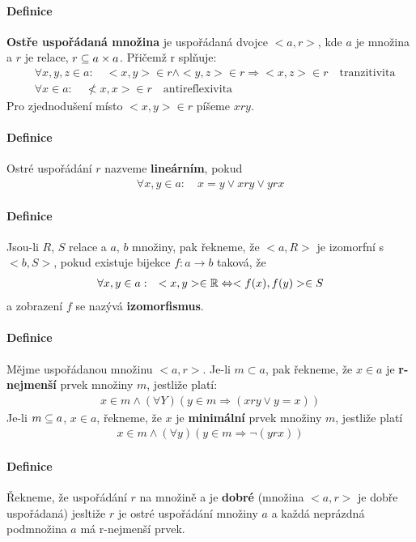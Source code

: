 \documentclass[a4paper,12pt,titlepage]{article}
\begin{document}
\paragraph{Definice}
\textbf{Ostře uspořádaná množina} je uspořádaná dvojce $<a, r>$, kde $a$ je
množina a $r$ je relace, $r \subseteq a \times a $. Přičemž r splňuje:
\begin{align}
	&\forall x, y, z \in a : \quad <x,y> \in r \land <y,z> \in r \Rightarrow
	<x,z> \in r \quad \text{tranzitivita} \\
	&\forall x \in a: \quad \not <x,x> \in r \quad \text{antireflexivita}
\end{align}
Pro zjednodušení místo $<x,y> \in r$ píšeme $x r y$.
\paragraph{Definice}
Ostré uspořádání $r$ nazveme \textbf{lineárním}, pokud 
\begin{align}
	\forall x,y \in a: \quad x = y \lor x r y \lor y r x 
\end{align}
\paragraph{Definice}
Jsou-li $R$, $S$ relace a $a$, $b$ množiny, pak řekneme, že $<a, R>$ je izomorfní
s $<b, S>$, pokud existuje bijekce $f: a\to b$ taková, že
\begin{align}
	\forall x,y \in a: \quad <x,y> \in \mathbb{R} \Leftrightarrow <f(x), f(y)> \in S
\end{align}
a zobrazení $f$ se nazývá \textbf{izomorfismus}.
\paragraph{Definice}
Mějme uspořádanou množinu $<a,r>$. Je-li $m \subset a$, pak řekneme, že $x \in a$
je \textbf{r-nejmenší} prvek množiny $m$, jestliže platí:
\begin{align}
	x \in m \land (\forall Y) (y \in m \Rightarrow (x r y \lor y = x))
\end{align}
Je-li $m \subseteq a$, $x \in a$, řekneme, že $x$ je \textbf{minimální} prvek
množiny $m$,
jestliže platí
\begin{align}
	x \in m \land (\forall y) ( y \in m \Rightarrow \neg (y r x))
\end{align}
\paragraph{Definice}
Řekneme, že uspořádání $r$ na množině a je \textbf{dobré} (množina $<a,r>$ je dobře
uspořádaná) jesltiže $r$ je ostré uspořádání množiny $a$ a každá neprázdná
podmnožina $a$ má r-nejmenší prvek.
\end{document}
